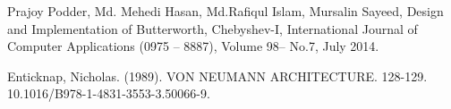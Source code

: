 \documentclass[letterpaper, 10 pt, conference]{ieeeconf}  %
\begin{document}




\begin{thebibliography}{99}

 Prajoy Podder, Md. Mehedi Hasan, Md.Rafiqul Islam, Mursalin Sayeed, Design and Implementation of Butterworth, Chebyshev-I, International Journal of Computer Applications (0975 – 8887), Volume 98– No.7, July 2014.

 Enticknap, Nicholas. (1989). VON NEUMANN ARCHITECTURE. 128-129. 10.1016/B978-1-4831-3553-3.50066-9. 




\end{thebibliography}
\end{document}
